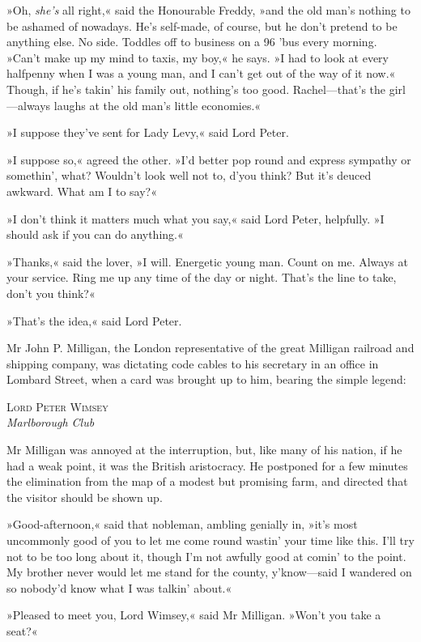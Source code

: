 »Oh, \textit{she's} all right,« said the Honourable Freddy, »and the old man's nothing to be ashamed of nowadays. He's self-made, of course, but he don't pretend to be anything else. No side. Toddles off to business on a 96 'bus every morning. »Can't make up my mind to taxis, my boy,« he says. »I had to look at every halfpenny when I was a young man, and I can't get out of the way of it now.« Though, if he's takin' his family out, nothing's too good. Rachel—that's the girl—always laughs at the old man's little economies.«

»I suppose they've sent for Lady Levy,« said Lord Peter.

»I suppose so,« agreed the other. »I'd better pop round and express sympathy or somethin', what? Wouldn't look well not to, d'you think? But it's deuced awkward. What am I to say?«

»I don't think it matters much what you say,« said Lord Peter, helpfully. »I should ask if you can do anything.«

»Thanks,« said the lover, »I will. Energetic young man. Count on me. Always at your service. Ring me up any time of the day or night. That's the line to take, don't you think?«

»That's the idea,« said Lord Peter.

Mr John P. Milligan, the London representative of the great Milligan railroad and shipping company, was dictating code cables to his secretary in an office in Lombard Street, when a card was brought up to him, bearing the simple legend:

\begin{center}
\textsc{Lord Peter Wimsey}\\
\textit{Marlborough Club}
\end{center}

Mr Milligan was annoyed at the interruption, but, like many of his nation, if he had a weak point, it was the British aristocracy. He postponed for a few minutes the elimination from the map of a modest but promising farm, and directed that the visitor should be shown up.

»Good-afternoon,« said that nobleman, ambling genially in, »it's most uncommonly good of you to let me come round wastin' your time like this. I'll try not to be too long about it, though I'm not awfully good at comin' to the point. My brother never would let me stand for the county, y'know—said I wandered on so nobody'd know what I was talkin' about.«

»Pleased to meet you, Lord Wimsey,« said Mr Milligan. »Won't you take a seat?«

